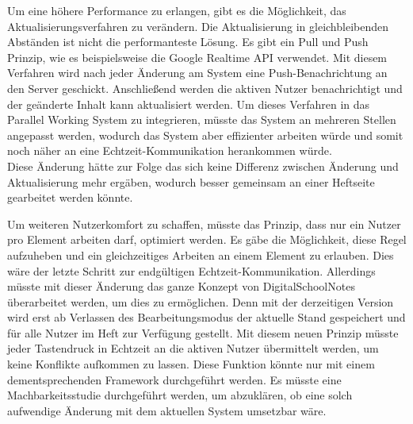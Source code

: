 Um eine höhere Performance zu erlangen, gibt es die Möglichkeit, das Aktualisierungsverfahren zu verändern. Die Aktualisierung in gleichbleibenden Abständen ist nicht die performanteste Lösung. Es gibt ein Pull und Push Prinzip, wie es beispielsweise die Google Realtime API verwendet. Mit diesem Verfahren wird nach jeder Änderung am System eine Push-Benachrichtung an den Server geschickt. Anschließend werden die aktiven Nutzer benachrichtigt und der geänderte Inhalt kann aktualisiert werden.
\newpage
Um dieses Verfahren in das Parallel Working System zu integrieren, müsste das System an mehreren Stellen angepasst werden, wodurch das System aber effizienter arbeiten würde und somit noch näher an eine Echtzeit-Kommunikation herankommen würde.\\
Diese Änderung hätte zur Folge das sich keine Differenz zwischen Änderung und Aktualisierung mehr ergäben, wodurch besser gemeinsam an einer Heftseite gearbeitet werden könnte.

Um weiteren Nutzerkomfort zu schaffen, müsste das Prinzip, dass nur ein Nutzer pro Element arbeiten darf, optimiert werden. Es gäbe die Möglichkeit, diese Regel aufzuheben und ein gleichzeitiges Arbeiten an einem Element zu erlauben. Dies wäre der letzte Schritt zur endgültigen Echtzeit-Kommunikation. Allerdings müsste mit dieser Änderung das ganze Konzept von DigitalSchoolNotes überarbeitet werden, um dies zu ermöglichen. Denn mit der derzeitigen Version wird erst ab Verlassen des Bearbeitungsmodus der aktuelle Stand gespeichert und für alle Nutzer im Heft zur Verfügung gestellt. Mit diesem neuen Prinzip müsste jeder Tastendruck in Echtzeit an die aktiven Nutzer übermittelt werden, um keine Konflikte aufkommen zu lassen. Diese Funktion könnte nur mit einem dementsprechenden Framework durchgeführt werden. Es müsste eine Machbarkeitsstudie durchgeführt werden, um abzuklären, ob eine solch aufwendige Änderung mit dem aktuellen System umsetzbar wäre.